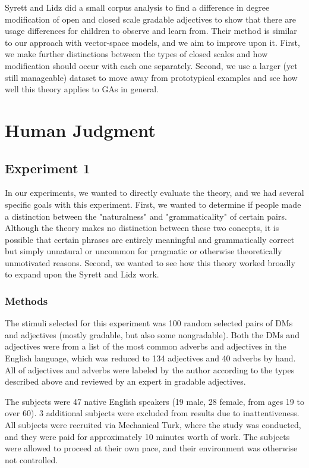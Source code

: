 \documentclass[11pt]{article}
\begin{document}
Syrett and Lidz  did a small corpus analysis to find a difference in degree modification of open and closed scale gradable adjectives to show that there are usage differences for children to observe and learn from. Their method is similar to our approach with vector-space models, and we aim to improve upon it. First, we make further distinctions between the types of closed scales and how modification should occur with each one separately. Second, we use a larger (yet still manageable) dataset to move away from prototypical examples and see how well this theory applies to GAs in general.

\section{Human Judgment}

\subsection{Experiment 1}

In our experiments, we wanted to directly evaluate the theory, and we had several specific goals with this experiment. First, we wanted to determine if people made a distinction between the "naturalness" and "grammaticality" of certain pairs. Although the theory makes no distinction between these two concepts, it is possible that certain phrases are entirely meaningful and grammatically correct but simply unnatural or uncommon for pragmatic or otherwise theoretically unmotivated reasons. Second, we wanted to see how this theory worked broadly to expand upon the Syrett and Lidz  work.

\subsubsection{Methods}
The stimuli selected for this experiment was 100 random selected pairs of DMs and adjectives (mostly gradable, but also some nongradable). Both the DMs and adjectives were from a list of the most common adverbs and adjectives in the English language, which was reduced to 134 adjectives and 40 adverbs by hand. All of adjectives and adverbs were labeled by the author according to the types described above and reviewed by an expert in gradable adjectives.

The subjects were 47 native English speakers (19 male, 28 female, from ages 19 to over 60). 3 additional subjects were excluded from results due to inattentiveness. All subjects were recruited via Mechanical Turk, where the study was conducted, and they were paid for approximately 10 minutes worth of work. The subjects were allowed to proceed at their own pace, and their environment was otherwise not controlled.
\end{document}
